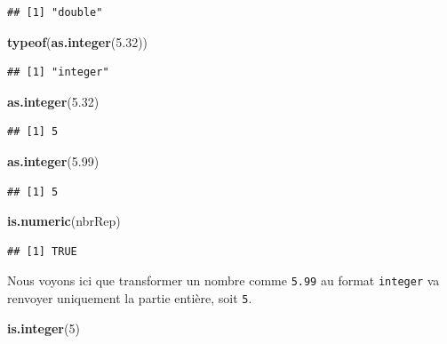 \documentclass[]{book}
\newenvironment{Shaded}{\begin{snugshade}}{\end{snugshade}}
\newcommand{\KeywordTok}[1]{\textcolor[rgb]{0.13,0.29,0.53}{\textbf{#1}}}
\newcommand{\DecValTok}[1]{\textcolor[rgb]{0.00,0.00,0.81}{#1}}
\newcommand{\FloatTok}[1]{\textcolor[rgb]{0.00,0.00,0.81}{#1}}
\newcommand{\NormalTok}[1]{#1}
\begin{document}
\begin{verbatim}
## [1] "double"
\end{verbatim}

\begin{Shaded}
\begin{Highlighting}[]
\KeywordTok{typeof}\NormalTok{(}\KeywordTok{as.integer}\NormalTok{(}\FloatTok{5.32}\NormalTok{))}
\end{Highlighting}
\end{Shaded}

\begin{verbatim}
## [1] "integer"
\end{verbatim}

\begin{Shaded}
\begin{Highlighting}[]
\KeywordTok{as.integer}\NormalTok{(}\FloatTok{5.32}\NormalTok{)}
\end{Highlighting}
\end{Shaded}

\begin{verbatim}
## [1] 5
\end{verbatim}

\begin{Shaded}
\begin{Highlighting}[]
\KeywordTok{as.integer}\NormalTok{(}\FloatTok{5.99}\NormalTok{)}
\end{Highlighting}
\end{Shaded}

\begin{verbatim}
## [1] 5
\end{verbatim}

\begin{Shaded}
\begin{Highlighting}[]
\KeywordTok{is.numeric}\NormalTok{(nbrRep)}
\end{Highlighting}
\end{Shaded}

\begin{verbatim}
## [1] TRUE
\end{verbatim}

Nous voyons ici que transformer un nombre comme \texttt{5.99} au format
\texttt{integer} va renvoyer uniquement la partie entière, soit
\texttt{5}.

\begin{Shaded}
\begin{Highlighting}[]
\KeywordTok{is.integer}\NormalTok{(}\DecValTok{5}\NormalTok{)}
\end{Highlighting}
\end{Shaded}
\end{document}

